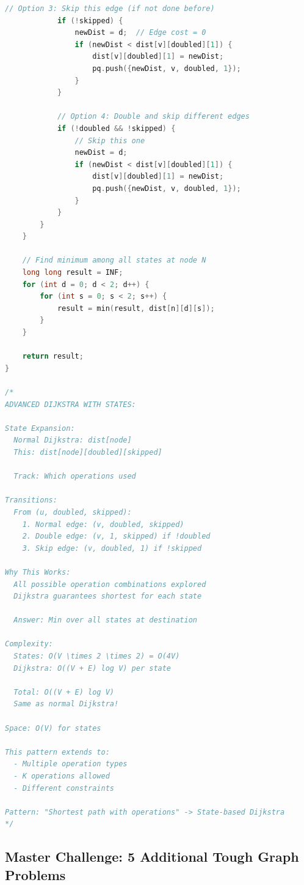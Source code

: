 \documentclass[11pt,a4paper,oneside]{book}
\begin{document}
\begin{lstlisting}[language=C++, caption=BS + Dijkstra Solutions - NEW PROBLEM]
            // Option 3: Skip this edge (if not done before)
            if (!skipped) {
                newDist = d;  // Edge cost = 0
                if (newDist < dist[v][doubled][1]) {
                    dist[v][doubled][1] = newDist;
                    pq.push({newDist, v, doubled, 1});
                }
            }
            
            // Option 4: Double and skip different edges
            if (!doubled && !skipped) {
                // Skip this one
                newDist = d;
                if (newDist < dist[v][doubled][1]) {
                    dist[v][doubled][1] = newDist;
                    pq.push({newDist, v, doubled, 1});
                }
            }
        }
    }
    
    // Find minimum among all states at node N
    long long result = INF;
    for (int d = 0; d < 2; d++) {
        for (int s = 0; s < 2; s++) {
            result = min(result, dist[n][d][s]);
        }
    }
    
    return result;
}

/*
ADVANCED DIJKSTRA WITH STATES:

State Expansion:
  Normal Dijkstra: dist[node]
  This: dist[node][doubled][skipped]
  
  Track: Which operations used

Transitions:
  From (u, doubled, skipped):
    1. Normal edge: (v, doubled, skipped)
    2. Double edge: (v, 1, skipped) if !doubled
    3. Skip edge: (v, doubled, 1) if !skipped

Why This Works:
  All possible operation combinations explored
  Dijkstra guarantees shortest for each state
  
  Answer: Min over all states at destination

Complexity:
  States: O(V \times 2 \times 2) = O(4V)
  Dijkstra: O((V + E) log V) per state
  
  Total: O((V + E) log V)
  Same as normal Dijkstra!

Space: O(V) for states

This pattern extends to:
  - Multiple operation types
  - K operations allowed
  - Different constraints

Pattern: "Shortest path with operations" -> State-based Dijkstra
*/
\end{lstlisting}

\subsection{Master Challenge: 5 Additional Tough Graph Problems}
\end{document}
